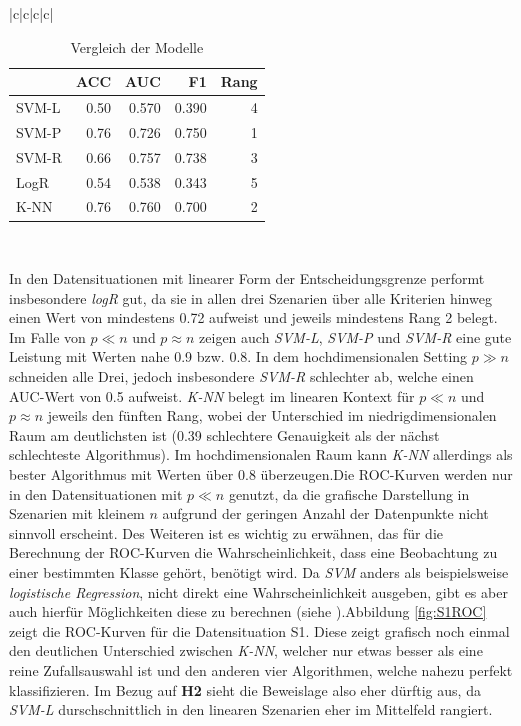 \documentclass[
]{article}
\begin{document}
{\begin{landscape}
\begin{table}[h]
\begin{tabular}{|c|c|c|c|}
\begin{tabular}{lrrrr}
\toprule
  & ACC & AUC & F1 & Rang\\
\midrule
SVM-L & 0.50 & 0.570 & 0.390 & 4\\
SVM-P & 0.76 & 0.726 & 0.750 & 1\\
SVM-R & 0.66 & 0.757 & 0.738 & 3\\
LogR & 0.54 & 0.538 & 0.343 & 5\\
K-NN & 0.76 & 0.760 & 0.700 & 2\\
\bottomrule
\end{tabular}  \\ \hline \end{tabular} \caption{Vergleich der Modelle} \label{tab:TabVergleich} \end{table}

\end{landscape}
\clearpage
} In den Datensituationen mit linearer Form der Entscheidungsgrenze
performt insbesondere \textit{logR} gut, da sie in allen drei Szenarien
über alle Kriterien hinweg einen Wert von mindestens 0.72 aufweist und
jeweils mindestens Rang 2 belegt. Im Falle von \(p \ll n\) und
\(p \approx n\) zeigen auch \textit{SVM-L}, \textit{SVM-P} und
\textit{SVM-R} eine gute Leistung mit Werten nahe 0.9 bzw. 0.8. In dem
hochdimensionalen Setting \(p \gg n\) schneiden alle Drei, jedoch
insbesondere \textit{SVM-R} schlechter ab, welche einen AUC-Wert von 0.5
aufweist. \textit{K-NN} belegt im linearen Kontext für \(p \ll n\) und
\(p \approx n\) jeweils den fünften Rang, wobei der Unterschied im
niedrigdimensionalen Raum am deutlichsten ist (0.39 schlechtere
Genauigkeit als der nächst schlechteste Algorithmus). Im
hochdimensionalen Raum kann \textit{K-NN} allerdings als bester
Algorithmus mit Werten über 0.8 überzeugen.\newline Die ROC-Kurven
werden nur in den Datensituationen mit \(p \ll n\) genutzt, da die
grafische Darstellung in Szenarien mit kleinem \(n\) aufgrund der
geringen Anzahl der Datenpunkte nicht sinnvoll erscheint. Des Weiteren
ist es wichtig zu erwähnen, das für die Berechnung der ROC-Kurven die
Wahrscheinlichkeit, dass eine Beobachtung zu einer bestimmten Klasse
gehört, benötigt wird. Da \textit{SVM} anders als beispielsweise
\textit{logistische Regression}, nicht direkt eine Wahrscheinlichkeit
ausgeben, gibt es aber auch hierfür Möglichkeiten diese zu berechnen
(siehe \cite{plattProbabilisticOutputsSupport2000}).\newline Abbildung
\ref{fig:S1ROC} zeigt die ROC-Kurven für die Datensituation S1. Diese
zeigt grafisch noch einmal den deutlichen Unterschied zwischen
\textit{K-NN}, welcher nur etwas besser als eine reine Zufallsauswahl
ist und den anderen vier Algorithmen, welche nahezu perfekt
klassifizieren. Im Bezug auf \textbf{H2} sieht die Beweislage also eher
dürftig aus, da \textit{SVM-L} durschschnittlich in den linearen
Szenarien eher im Mittelfeld rangiert.
\end{document}
